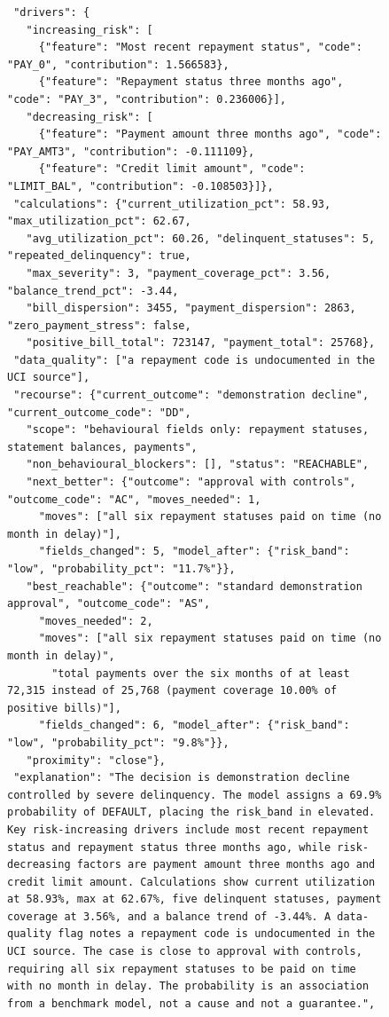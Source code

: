 \documentclass[twocolumn,10pt]{article}
\begin{document}
\begin{figure}[!tp]
\begin{minipage}[t]{0.57\textwidth}
\begin{lstlisting}
 "drivers": {
   "increasing_risk": [
     {"feature": "Most recent repayment status", "code": "PAY_0", "contribution": 1.566583},
     {"feature": "Repayment status three months ago", "code": "PAY_3", "contribution": 0.236006}],
   "decreasing_risk": [
     {"feature": "Payment amount three months ago", "code": "PAY_AMT3", "contribution": -0.111109},
     {"feature": "Credit limit amount", "code": "LIMIT_BAL", "contribution": -0.108503}]},
 "calculations": {"current_utilization_pct": 58.93, "max_utilization_pct": 62.67,
   "avg_utilization_pct": 60.26, "delinquent_statuses": 5, "repeated_delinquency": true,
   "max_severity": 3, "payment_coverage_pct": 3.56, "balance_trend_pct": -3.44,
   "bill_dispersion": 3455, "payment_dispersion": 2863, "zero_payment_stress": false,
   "positive_bill_total": 723147, "payment_total": 25768},
 "data_quality": ["a repayment code is undocumented in the UCI source"],
 "recourse": {"current_outcome": "demonstration decline", "current_outcome_code": "DD",
   "scope": "behavioural fields only: repayment statuses, statement balances, payments",
   "non_behavioural_blockers": [], "status": "REACHABLE",
   "next_better": {"outcome": "approval with controls", "outcome_code": "AC", "moves_needed": 1,
     "moves": ["all six repayment statuses paid on time (no month in delay)"],
     "fields_changed": 5, "model_after": {"risk_band": "low", "probability_pct": "11.7%"}},
   "best_reachable": {"outcome": "standard demonstration approval", "outcome_code": "AS",
     "moves_needed": 2,
     "moves": ["all six repayment statuses paid on time (no month in delay)",
       "total payments over the six months of at least 72,315 instead of 25,768 (payment coverage 10.00% of positive bills)"],
     "fields_changed": 6, "model_after": {"risk_band": "low", "probability_pct": "9.8%"}},
   "proximity": "close"},
 "explanation": "The decision is demonstration decline controlled by severe delinquency. The model assigns a 69.9% probability of DEFAULT, placing the risk_band in elevated. Key risk-increasing drivers include most recent repayment status and repayment status three months ago, while risk-decreasing factors are payment amount three months ago and credit limit amount. Calculations show current utilization at 58.93%, max at 62.67%, five delinquent statuses, payment coverage at 3.56%, and a balance trend of -3.44%. A data-quality flag notes a repayment code is undocumented in the UCI source. The case is close to approval with controls, requiring all six repayment statuses to be paid on time with no month in delay. The probability is an association from a benchmark model, not a cause and not a guarantee.",

\end{lstlisting}
\end{minipage}
\end{figure}
\end{document}
